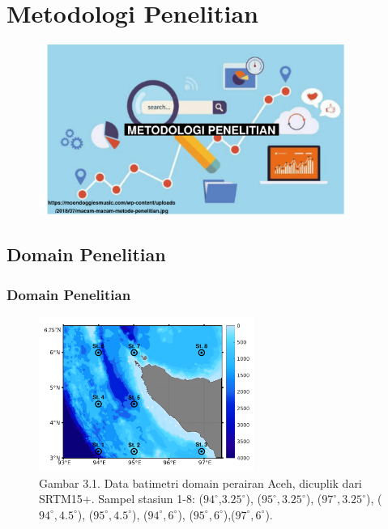 \documentclass{beamer}
\begin{document}
\section{Metodologi Penelitian}
\begin{frame}
	\centering
	\begin{figure}[H]
		\centering
		\includegraphics[width=10cm]{Bg_3}
	\end{figure}
\end{frame}
\subsection{Domain Penelitian}
\begin{frame}
	\frametitle{Domain Penelitian}
	\begin{figure}[H]
		\centering
		\includegraphics[width=7cm]{bathymetri}
		\captionsetup{labelformat=empty}
		\caption{Gambar 3.1. Data batimetri domain perairan Aceh, dicuplik dari SRTM15+. Sampel stasiun 1-8: ($94^\circ$,$3.25^\circ$), ($95^\circ,3.25^\circ$), ($97^\circ,3.25^\circ$),	($94^\circ,4.5^\circ$), ($95^\circ,4.5^\circ$),	($94^\circ,6^\circ$), ($95^\circ,6^\circ$),($97^\circ,6^\circ$).}
		\label{fig:domain}
		
	\end{figure}
\end{frame}
\end{document}
